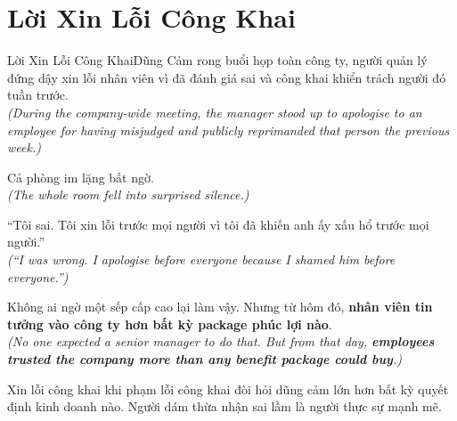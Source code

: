 \section{Lời Xin Lỗi Công Khai}
\begin{truyen}{Lời Xin Lỗi Công Khai}{Dũng Cảm}
rong buổi họp toàn công ty, người quản lý đứng dậy xin lỗi nhân viên vì đã đánh giá sai và công khai khiển trách người đó tuần trước.\\
\textit{(During the company-wide meeting, the manager stood up to apologise to an employee for having misjudged and publicly reprimanded that person the previous week.)}

Cả phòng im lặng bất ngờ.\\
\textit{(The whole room fell into surprised silence.)}

``Tôi sai. Tôi xin lỗi trước mọi người vì tôi đã khiến anh ấy xấu hổ trước mọi người.''\\
\textit{(``I was wrong. I apologise before everyone because I shamed him before everyone.'')}

Không ai ngờ một sếp cấp cao lại làm vậy. Nhưng từ hôm đó, \textbf{nhân viên tin tưởng vào công ty hơn bất kỳ package phúc lợi nào}.\\
\textit{(No one expected a senior manager to do that. But from that day, \textbf{employees trusted the company more than any benefit package could buy}.)}
\end{truyen}
\begin{baihoc}
  Xin lỗi công khai khi phạm lỗi công khai đòi hỏi dũng cảm lớn hơn bất kỳ quyết định kinh doanh nào. Người dám thừa nhận sai lầm là người thực sự mạnh mẽ.
\end{baihoc}

